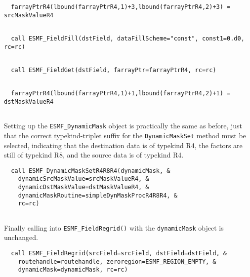 
 \begin{verbatim}
  farrayPtrR4(lbound(farrayPtrR4,1)+3,lbound(farrayPtrR4,2)+3) = srcMaskValueR4
 
\end{verbatim}
 

 \begin{verbatim}
  call ESMF_FieldFill(dstField, dataFillScheme="const", const1=0.d0, rc=rc)
 
\end{verbatim}
 

 \begin{verbatim}
  call ESMF_FieldGet(dstField, farrayPtr=farrayPtrR4, rc=rc)
 
\end{verbatim}
 

 \begin{verbatim}
  farrayPtrR4(lbound(farrayPtrR4,1)+1,lbound(farrayPtrR4,2)+1) = dstMaskValueR4
 
\end{verbatim}
 

   Setting up the {\tt ESMF\_DynamicMask} object is practically the same as 
   before, just that the correct typekind-triplet suffix for the 
   {\tt DynamicMaskSet} method must be selected, indicating that the 
   destination data is of typekind R4, the factors are still of typekind R8,
   and the source data is of typekind R4. 

 \begin{verbatim}
  call ESMF_DynamicMaskSetR4R8R4(dynamicMask, &
    dynamicSrcMaskValue=srcMaskValueR4, &
    dynamicDstMaskValue=dstMaskValueR4, &
    dynamicMaskRoutine=simpleDynMaskProcR4R8R4, &
    rc=rc)
 
\end{verbatim}
 

   Finally calling into {\tt ESMF\_FieldRegrid()} with the {\tt dynamicMask}
   object is unchanged. 

 \begin{verbatim}
  call ESMF_FieldRegrid(srcField=srcField, dstField=dstField, &
    routehandle=routehandle, zeroregion=ESMF_REGION_EMPTY, &
    dynamicMask=dynamicMask, rc=rc)
 
\end{verbatim}

\setlength{\parskip}{\oldparskip}
\setlength{\parindent}{\oldparindent}
\setlength{\baselineskip}{\oldbaselineskip}

